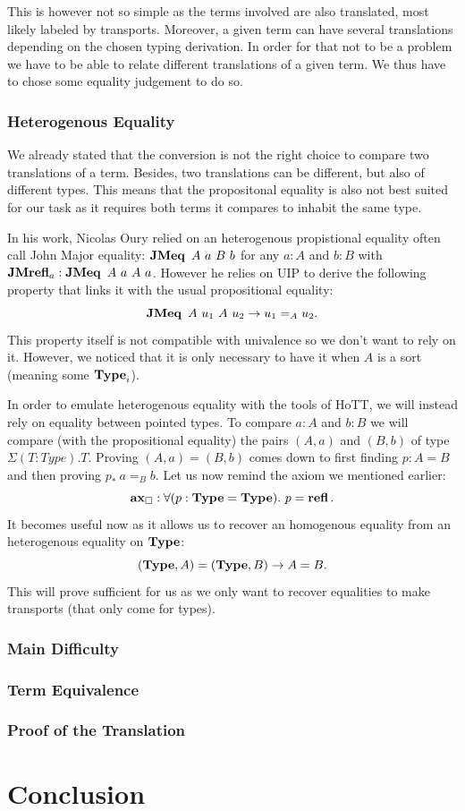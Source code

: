 \documentclass[11pt]{article}
\theoremstyle{plain}
\theoremstyle{remark}
\begin{document}
This is however not so simple as the terms involved are also translated,
most likely labeled by transports. Moreover, a given term can have
several translations depending on the chosen typing derivation.
In order for that not to be a problem we have to be able to relate different
translations of a given term. We thus have to chose some equality judgement
to do so.

\subsubsection{Heterogenous Equality}

We already stated that the conversion is not the right choice to compare two
translations of a term.
Besides, two translations can be different, but also of different types.
This means that the propositonal equality is also not best suited for our task
as it requires both terms it compares to inhabit the same type.

In his work, Nicolas Oury relied on an heterogenous propistional equality
often call John Major equality: $\operatorname{\mathbf{JMeq}}\ A\ a\ B\ b$ for any $a : A$ and $b: B$
with $\operatorname{\mathbf{JMrefl}}_a : \operatorname{\mathbf{JMeq}}\ A\ a\ A\ a$.
However he relies on UIP to derive the following property that links it with
the usual propositional equality:
\[\operatorname{\mathbf{JMeq}}\ A\ u_1\ A\ u_2 \to u_1 =_A u_2.\]
This property itself is not compatible with univalence so we don't want to rely
on it. However, we noticed that it is only necessary to have it when $A$ is a
sort (meaning some $\operatorname{\mathbf{Type}}_i$).

In order to emulate heterogenous equality with the tools of HoTT, we will
instead rely on equality between pointed types.
To compare $a : A$ and $b : B$ we will compare (with the propositional equality)
the pairs $(A,a)$ and $(B,b)$ of type $\Sigma (T : Type).T$.
Proving $(A,a) = (B,b)$ comes down to first finding $p : A = B$ and then
proving $p_*\ a =_B b$.
Let us now remind the axiom we mentioned earlier:
\[ \operatorname{\mathbf{ax}_\square} : \forall (p : \operatorname{\mathbf{Type}} = \operatorname{\mathbf{Type}}).\ p = \operatorname{\mathbf{refl}}. \]
It becomes useful now as it allows us to recover an homogenous equality from
an heterogenous equality on $\operatorname{\mathbf{Type}}$:
\[ (\operatorname{\mathbf{Type}}, A) = (\operatorname{\mathbf{Type}}, B) \to A = B. \]
This will prove sufficient for us as we only want to recover equalities to
make transports (that only come for types).

\subsubsection{Main Difficulty}

\subsubsection{Term Equivalence}

\subsubsection{Proof of the Translation}

\section*{Conclusion}




\end{document}
